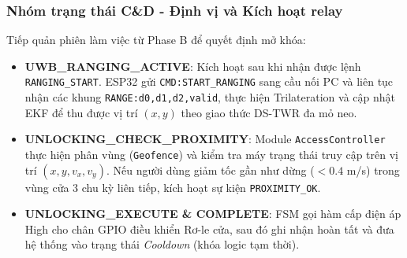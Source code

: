 \subsubsection{Nhóm trạng thái C\&D - Định vị và Kích hoạt relay}
Tiếp quản phiên làm việc từ Phase B để quyết định mở khóa:
\begin{itemize}
  \item \textbf{UWB\_RANGING\_ACTIVE}: Kích hoạt sau khi nhận được lệnh \texttt{RANGING\_START}. ESP32 gửi \texttt{CMD:START\_RANGING} sang cầu nối PC và liên tục nhận các khung \texttt{RANGE:d0,d1,d2,valid}, thực hiện Trilateration và cập nhật EKF để thu được vị trí $(x, y)$ theo giao thức DS-TWR đa mỏ neo.
  \item \textbf{UNLOCKING\_CHECK\_PROXIMITY}: Module \texttt{AccessController} thực hiện phân vùng (\texttt{Geofence}) và kiểm tra máy trạng thái truy cập trên vị trí $(x, y, v_x, v_y)$. Nếu người dùng giảm tốc gần như dừng ($<0.4$ m/s) trong vùng cửa 3 chu kỳ liên tiếp, kích hoạt sự kiện \texttt{PROXIMITY\_OK}.
  \item \textbf{UNLOCKING\_EXECUTE \& COMPLETE}: FSM gọi hàm cấp điện áp High cho chân GPIO điều khiển Rơ-le cửa, sau đó ghi nhận hoàn tất và đưa hệ thống vào trạng thái \textit{Cooldown} (khóa logic tạm thời).
\end{itemize}